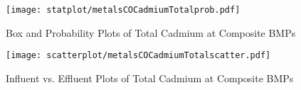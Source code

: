         \begin{figure}[hb]   %
            \centering
            \texttt{[image: statplot/metalsCOCadmiumTotalprob.pdf]}
            \caption{Box and Probability Plots of Total Cadmium at Composite BMPs}
        \end{figure}         %
        
        
        \begin{figure}[hb]   %
            \centering
            \texttt{[image: scatterplot/metalsCOCadmiumTotalscatter.pdf]}
            \caption{Influent vs. Effluent Plots of Total Cadmium at Composite BMPs}
        \end{figure}         %
        \clearpage
        